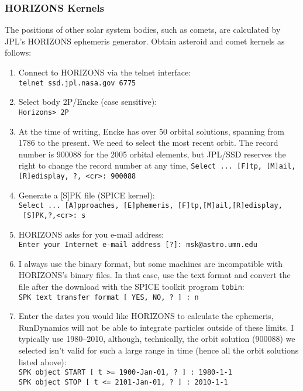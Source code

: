 \documentclass[12pt,letterpaper]{article}
\newcommand\rundynamics{RunDynamics}
\begin{document}
\subsubsection{HORIZONS Kernels}
The positions of other solar system bodies, such as comets, are
calculated by JPL's HORIZONS ephemeris generator.  Obtain asteroid and
comet kernels as follows:
\begin{enumerate}
\item Connect to HORIZONS via the telnet interface:\\ \texttt{telnet
ssd.jpl.nasa.gov 6775}

\item Select body 2P/Encke (case sensitive):\\ \texttt{Horizons> 2P}

\item At the time of writing, Encke has over 50 orbital solutions,
spanning from 1786 to the present.  We need to select the most recent
orbit.  The record number is 900088 for the 2005 orbital elements, but
JPL/SSD reserves the right to change the record number at any time,
\texttt{Select ... [F]tp, [M]ail, [R]edisplay, ?, <cr>: 900088}

\item Generate a [S]PK file (SPICE kernel):\\ \texttt{Select
... [A]pproaches, [E]phemeris, [F]tp,[M]ail,[R]edisplay,}\\\texttt{ [S]PK,?,<cr>:
s }

\item HORIZONS asks for you e-mail address:\\ \texttt{Enter your
Internet e-mail address [?]: msk@astro.umn.edu}

\item I always use the binary format, but some machines are
incompatible with HORIZONS's binary files.  In that case, use the text
format and convert the file after the download with the SPICE toolkit
program \texttt{tobin}:\\ \texttt{SPK text transfer format [ YES, NO,
? ] : n}

\item Enter the dates you would like HORIZONS to calculate the
ephemeris, \rundynamics{} will not be able to integrate particles
outside of these limits.  I typically use 1980--2010, although,
technically, the orbit solution (900088) we selected isn't valid for
such a large range in time (hence all the orbit solutions listed
above):\\ \texttt{SPK object START [ t >= 1900-Jan-01, ?  ] :
1980-1-1\\SPK object STOP [ t <= 2101-Jan-01, ? ] : 2010-1-1}


\end{enumerate}
\end{document}

